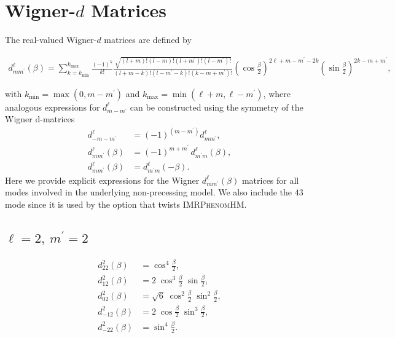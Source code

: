 \documentclass[%
aps,
prd,
amssymb,
amsmath,
amsfonts,
eqsecnum,
showpacs,
nofootinbib,
floatfix,
twocolumn,
twoside,
a4paper,
superscriptaddress
]{revtex4-1}
\newcommand{\mpr}{m^{\prime}}
\newcommand{\phHM}{\textsc{IMRPhenomHM}\xspace}
\newcommand{\botwo}{\frac{\beta}{2}}
\begin{document}

\appendix

\section{Wigner-\texorpdfstring{$d$}{d} Matrices}
\label{appendix:wignerd}

The real-valued Wigner-$d$ matrices are defined by \cite{Goldberg:1966uu,Brown:2007jx}
\begin{widetext}
\begin{align}
    d_{m m^{\prime}}^{\ell}(\beta)=\sum_{k=k_{\min }}^{k_{\max }} \frac{(-1)^{k}}{k !} \frac{\sqrt{(l+m) !(l-m) !\left(l+m^{\prime}\right) !\left(l-m^{\prime}\right) !}}{(l+m-k) !\left(l-m^{\prime}-k\right) !\left(k-m+m^{\prime}\right) !}\left(\cos \frac{\beta}{2}\right)^{2 \ell+m-m^{\prime}-2 k}\left(\sin \frac{\beta}{2}\right)^{2 k-m+m^{\prime}} ,
\end{align}
\end{widetext}
with $k_{\min }=\max\left(0,m-m^{\prime}\right)$ and $k_{\max }=\min(\ell+m,\ell-m^{\prime})$,
where analogous expressions for $d_{m -\mpr}^{\ell}$ can be constructed using the symmetry of the Wigner d-matrices
\begin{align}
    d^{\ell}_{-m -\mpr} &= (-1)^{(m-\mpr)} d^{\ell}_{m \mpr}, \\
    d^{\ell}_{m \mpr} (\beta) &= (-1)^{m + \mpr} \, d^{\ell}_{\mpr m} (\beta), \\ d^{\ell}_{m \mpr} (\beta) &= d^{\ell}_{\mpr m }(-\beta) .
\end{align} 
Here we provide explicit expressions for the Wigner $d_{m \mpr}^{\ell}(\beta)$ matrices for all modes involved in the underlying non-precessing model. We also include the $43$ mode since it is used by the option that twists \phHM.
\subsection{\texorpdfstring{$\ell = 2, \:m^{\prime} = 2$}{l=2,m'=2}}
\begin{align*}
    d^2_{22} (\beta) &= \cos^4 \botwo, \\
    d^2_{12} (\beta) &= 2 \;  \cos^3 \botwo \; \sin \botwo, \\
    d^2_{02} (\beta) &= \sqrt{6} \;  \cos^2 \botwo \; \sin^2 \botwo, \\
    d^2_{-12} (\beta) &= 2 \;  \cos \botwo \; \sin^3 \botwo, \\
    d^2_{-22} (\beta) &= \sin^4 \botwo.
\end{align*}
\end{document}
